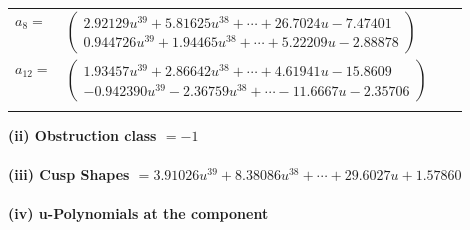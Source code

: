 \documentclass[1p]{elsarticle_modified}
\theoremstyle{definition}
\begin{document}
\begin{tabular}{m{7pt} m{180pt} m{7pt} m{180pt} }
\flushright $a_{8}=$&$\begin{pmatrix}2.92129 u^{39}+5.81625 u^{38}+\cdots+26.7024 u-7.47401\\0.944726 u^{39}+1.94465 u^{38}+\cdots+5.22209 u-2.88878\end{pmatrix}$ \\
\flushright $a_{12}=$&$\begin{pmatrix}1.93457 u^{39}+2.86642 u^{38}+\cdots+4.61941 u-15.8609\\-0.942390 u^{39}-2.36759 u^{38}+\cdots-11.6667 u-2.35706\end{pmatrix}$\\&\end{tabular}
\flushleft \textbf{(ii) Obstruction class $= -1$}\\~\\
\flushleft \textbf{(iii) Cusp Shapes $= 3.91026 u^{39}+8.38086 u^{38}+\cdots+29.6027 u+1.57860$}\\~\\
\newpage\renewcommand{\arraystretch}{1}
\flushleft \textbf{(iv) u-Polynomials at the component}\newline \\
\end{document}
